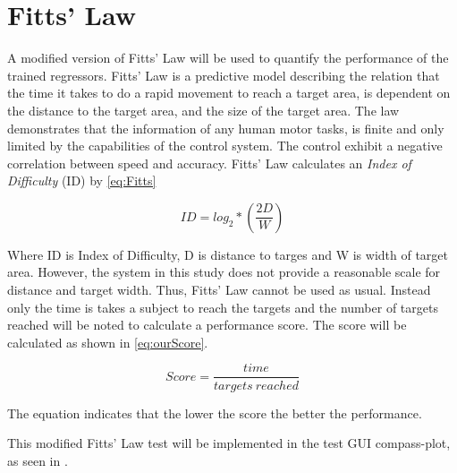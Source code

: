 \section{Fitts' Law}

A modified version of Fitts' Law will be used to quantify the performance of the trained regressors. Fitts' Law is a predictive model describing the relation that the time it takes to do a rapid movement to reach a target area, is dependent on the distance to the target area, and the size of the target area. The law demonstrates that the information of any human motor tasks, is finite and only limited by the capabilities of the control system. The control exhibit a negative correlation between speed and accuracy. \cite{Kamavuako2014}
Fitts' Law calculates an \textit{Index of Difficulty} (ID) by \eqref{eq:Fitts}

\begin{equation} \label{eq:Fitts}
ID = log_{2} * (\frac{2D}{W})
\end{equation}

Where ID is Index of Difficulty, D is distance to targes and W is width of target area. However, the system in this study does not provide a reasonable scale for distance and target width. Thus, Fitts' Law cannot be used as usual. Instead only the time is takes a subject to reach the targets and the number of targets reached will be noted to calculate a performance score. The score will be calculated as shown in \eqref{eq:ourScore}.

\begin{equation} \label{eq:ourScore}
	Score = \frac{time}{targets\ reached}
\end{equation}

The equation indicates that the lower the score the better the performance.

This modified Fitts' Law test will be implemented in the test GUI compass-plot, as seen in . 

